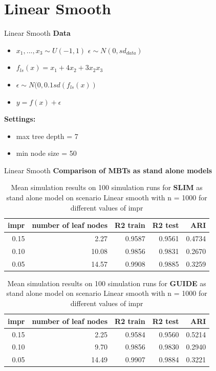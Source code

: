 \documentclass[9pt, xcolor=table]{beamer}
\begin{document}
\section{Linear Smooth}
\begin{frame}{Linear Smooth}
\textbf{Data}
\begin{itemize}
    \item $x_1,..., x_3 \sim U(-1,1)$ $\epsilon \sim N(0, sd_{data})$
    \item $ f_{ls}(x) = x_1 + 4   x_2 + 3   x_2   x_3 $
    \item $\epsilon \sim N(0, 0.1 sd(f_{ls}(x))$
    \item $y = f(x) + \epsilon$
\end{itemize}

\textbf{Settings:}
\begin{itemize}
    \item max tree depth = 7 
    \item min node size = 50    
\end{itemize}

\end{frame}

\begin{frame}{Linear Smooth}
\textbf{Comparison of MBTs as stand alone models}
\begin{table}
\caption{Mean simulation results on 100 simulation runs for \textbf{SLIM} as stand alone model on scenario Linear smooth with n = 1000 for different values of impr}
\centering 
\begin{tabular}[t]{r|r|r|r|r}
\hline
impr & number of leaf nodes & R2 train & R2 test & ARI\\
\hline
0.15 & 2.27 & 0.9587 & 0.9561 & 0.4734\\
\hline
0.10 & 10.08 & 0.9856 & 0.9831 & 0.2670\\
\hline
0.05 & 14.57 & 0.9908 & 0.9885 & 0.3259\\
\hline
\end{tabular}
\end{table}


\begin{table}

\caption{Mean simulation results on 100 simulation runs for \textbf{GUIDE} as stand alone model on scenario Linear smooth with n = 1000 for different values of impr}
\centering 
\begin{tabular}[t]{r|r|r|r|r}
\hline
impr & number of leaf nodes & R2 train & R2 test & ARI\\
\hline
0.15 & 2.25 & 0.9584 & 0.9560 & 0.5214\\
\hline
0.10 & 9.70 & 0.9856 & 0.9830 & 0.2940\\
\hline
0.05 & 14.49 & 0.9907 & 0.9884 & 0.3221\\
\hline
\end{tabular}
\end{table}
    
\end{frame}
\end{document}
